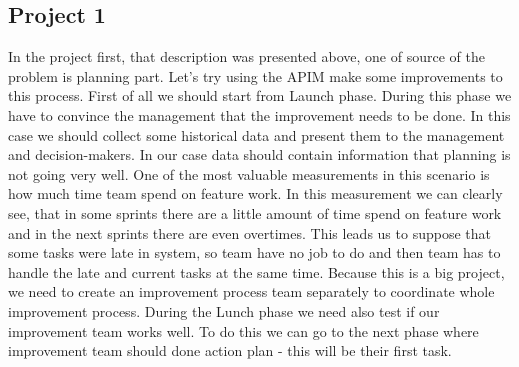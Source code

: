\subsection*{Project 1}
In the project first, that description was presented above, one of source of the problem is planning part. Let's try using the APIM make some improvements to this process.  First of all we should start from Launch phase. During this phase we have to convince the management that the improvement needs to be done. In this case we should collect some historical data and present them to the management and decision-makers. In our case data should contain information that planning is not going very well. One of the most valuable measurements in this scenario is how much time team spend on feature work. In this measurement we can clearly see, that in some sprints there are a little amount of time spend on feature work and in the next sprints there are even overtimes. 
This leads us to suppose that some tasks were late in system, so team have no job to do and then team has to handle the late and current tasks at the same time. Because this is a big project, we need to create an improvement process team separately to coordinate whole improvement process. During the Lunch phase we need also test if our improvement team works well. To do this we can go to the next phase where  improvement team should done action plan - this will be their first task.


